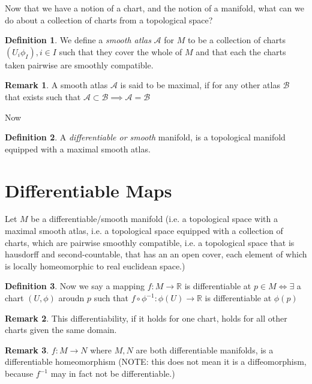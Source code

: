 \documentclass[12pt]{book}
\theoremstyle{definition}
\newtheorem*{definition}{Definition}
\newtheorem*{remark}{Remark}
\begin{document}
Now that we have a notion of a chart, and the notion of a manifold, what can we do about a collection of charts from a topological space?
\begin{definition}
    We define a \textit{smooth atlas} $\mathcal{A}$ for $M$ to be a collection of charts $(U_i\phi_I), i \in I$ such that they cover the whole of $M$ and that each the charts taken pairwise are smoothly compatible.
\end{definition}
\begin{remark}
    A smooth atlas $\mathcal{A}$ is said to be maximal, if for any other atlas $\mathcal{B}$ that exists such that $\mathcal{A} \subset \mathcal{B} \implies \mathcal{A} = \mathcal{B}$
\end{remark}
Now
\begin{definition}
    A \textit{differentiable or smooth} manifold, is a topological manifold equipped with a maximal smooth atlas.
\end{definition}
\section{Differentiable Maps}
    Let $M$ be a differentiable/smooth manifold (i.e. a topological space with a maximal smooth atlas, i.e. a topological space equipped with a collection of charts, which are pairwise smoothly compatible, i.e. a topological space that is hausdorff and second-countable, that has an an open cover, each element of which is locally homeomorphic to real euclidean space.)
\begin{definition}
    Now we say a mapping $f:M \to \mathbb{R}$ is differentiable at $p \in M \iff \exists$ a chart $(U, \phi)$ aroudn $p$ such that $f \circ \phi^{-1}: \phi(U) \to \mathbb{R}$ is differentiable at $\phi(p)$
\end{definition}
\begin{remark}
    This differentiability, if it holds for one chart, holds for all other charts given the same domain.
\end{remark}
\begin{remark}
    $f: M \to N$ where $M, N$ are both differentiable manifolds, is a differentiable homeomorphism (NOTE: this does not mean it is a diffeomorphism, because $f^{-1}$ may in fact not be differentiable.)
\end{remark}
\end{document}
